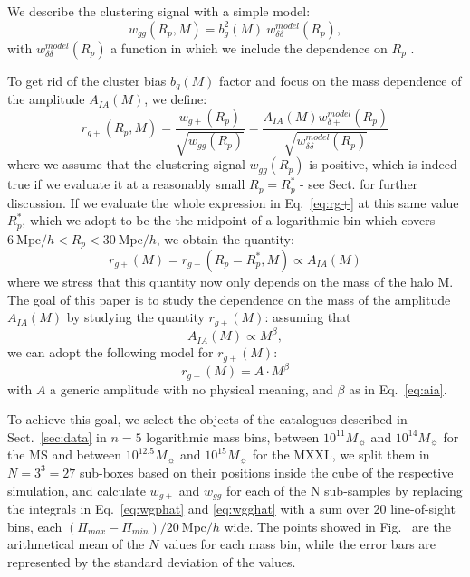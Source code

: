 \documentclass[a4paper,fleqn,usenatbib]{mnras}
\begin{document}
We describe the clustering signal with a simple model:
\begin{equation}
    w_{gg} (R_p, M)=b_g^2 (M)\ w_{\delta \delta}^{model} (R_p), 
	\label{eq:wgg}
\end{equation}
with $w_{\delta \delta}^{model} (R_p)$ a function in which we include the dependence on $R_p$ \citep[equation 9]{vanUitertJoachimi2017}.

To get rid of the cluster bias $b_g (M)$ factor and focus on the mass dependence of the amplitude $A_{IA} (M)$, we define:
\begin{equation}
    r_{g+} (R_p, M)=\frac{w_{g+} (R_p)}{\sqrt{w_{gg} (R_p)}} =\frac{A_{IA} (M) w_{\delta +}^{model} (R_p) }{\sqrt{w_{\delta \delta}^{model} (R_p)}}
	\label{eq:rg+}
\end{equation}
where we assume that the clustering signal $w_{gg}(R_p)$ is positive, which is indeed true if we evaluate it at a reasonably small $R_p = R_p^*$ - see Sect. for further discussion. If we evaluate the whole expression in Eq.~\ref{eq:rg+} at this same value $R_p^*$, which we adopt to be the the midpoint of a logarithmic bin which covers $6 \ \mbox{Mpc}/h < R_p < 30 \ \mbox{Mpc}/h$, we obtain the quantity:
\begin{equation}
    r_{g+} (M) = r_{g+} (R_p = R_p^*, M) \propto A_{IA} (M)
	\label{eq:rg+m}
\end{equation}
where we stress that this quantity now only depends on the mass of the halo M. The goal of this paper is to study the dependence on the mass of the amplitude $A_{IA} (M)$ by studying the quantity $r_{g+} (M)$: assuming that
\begin{equation}
A_{IA} (M)\propto M^{\beta}, 
	\label{eq:aia}
\end{equation}
we can adopt the following model for $r_{g+} (M)$:
\begin{equation}
    r_{g+} (M) = A \cdot  M^{\beta}
	\label{eq:modelrg+}
\end{equation}
with $A$ a generic amplitude with no physical meaning, and $\beta$ as in Eq.~\ref{eq:aia}.

To achieve this goal, we select the objects of the catalogues described in Sect.~\ref{sec:data} in $n = 5$ logarithmic mass bins, between $10^{11} M_{\sun}$ and $10^{14} M_{\sun}$ for the MS and between $10^{12.5} M_{\sun}$ and $10^{15} M_{\sun}$ for the MXXL, we split them in $N = 3^3 = 27$ sub-boxes based on their positions inside the cube of the respective simulation, and calculate $w_{g+}$ and $w_{gg}$ for each of the N sub-samples by replacing the integrals in Eq.~\ref{eq:wgphat} and \ref{eq:wgghat} with a sum over 20 line-of-sight bins, each $(\Pi_{max} - \Pi_{min})/ 20 \ \mbox{Mpc}/h$ wide.  The points showed in Fig.~ are the arithmetical mean of the $N$ values for each mass bin, while the error bars are represented by the standard deviation of the values.
\end{document}
